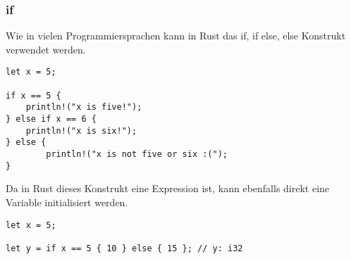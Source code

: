 \subsubsection{if}
Wie in vielen Programmiersprachen kann in Rust das if, if else, else Konstrukt verwendet werden.

\begin{lstlisting}
let x = 5;

if x == 5 {
	println!("x is five!");
} else if x == 6 {
	println!("x is six!");
} else {
		println!("x is not five or six :(");
}
\end{lstlisting}

Da in Rust dieses Konstrukt eine Expression ist, kann ebenfalls direkt eine Variable initialisiert werden.

\begin{lstlisting}
let x = 5;

let y = if x == 5 { 10 } else { 15 }; // y: i32
\end{lstlisting}